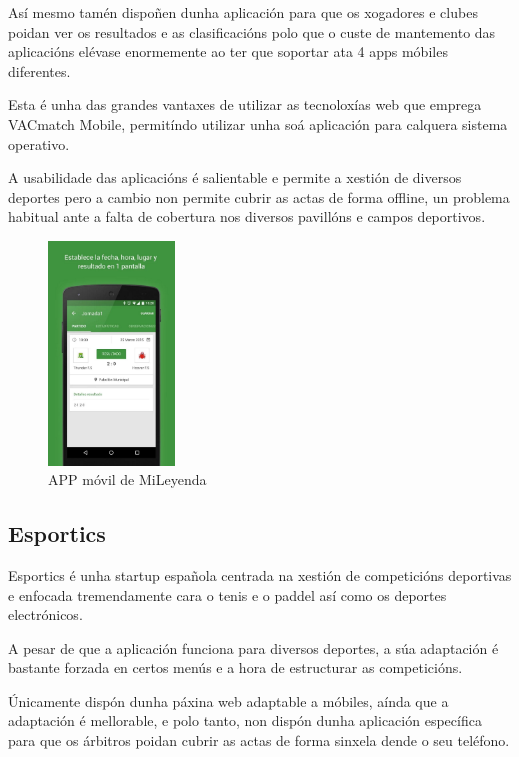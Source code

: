     Así mesmo tamén dispoñen dunha aplicación para que os xogadores e clubes poidan ver 
os resultados e as clasificacións polo que o custe de mantemento das aplicacións elévase 
enormemente ao ter que soportar ata 4 apps móbiles diferentes.
    
    Esta é unha das grandes vantaxes de utilizar as tecnoloxías web que emprega VACmatch 
Mobile, permitíndo utilizar unha soá aplicación para calquera sistema operativo.

    A usabilidade das aplicacións é salientable e permite a xestión de diversos deportes 
pero a cambio non permite cubrir as actas de forma offline, un problema habitual ante a 
falta de cobertura nos diversos pavillóns e campos deportivos.
  
      \begin{figure}[h!]
	\begin{center}
	  \includegraphics[width=0.3\textwidth]{./img/mileyenda-app.png}
	  \caption{APP móvil de MiLeyenda}
	\end{center}
      \end{figure}

\clearpage

    \subsection{Esportics}

    Esportics é unha startup española centrada na xestión de competicións 
deportivas e enfocada tremendamente cara o tenis e o paddel así como os deportes 
electrónicos.

A pesar de que a aplicación funciona para diversos deportes, a súa adaptación é bastante 
forzada en certos menús e a hora de estructurar as competicións.

    Únicamente dispón dunha páxina web adaptable a móbiles, aínda que a adaptación é 
mellorable, e polo tanto, non dispón dunha aplicación específica para que os árbitros 
poidan cubrir as actas de forma sinxela dende o seu teléfono.

